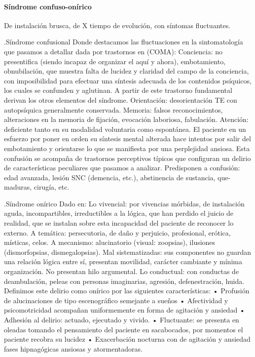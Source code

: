 \documentclass[encares.tex]{subfiles}
\begin{document}
\paragraph{Síndrome confuso-onírico}

De instalación brusca, de X tiempo de evolución, con síntomas fluctuantes.

.Síndrome confusional
Donde destacamos las fluctuaciones en la sintomatología que pasamos a detallar dada por trastornos en (COMA): Conciencia: no presentifica (siendo incapaz de organizar el aquí y ahora), embotamiento, obnubilación, que muestra falta de lucidez y claridad del campo de la conciencia, con imposibilidad para efectuar una síntesis adecuada de los contenidos psíquicos, los cuales se confunden y aglutinan. A partir de este trastorno fundamental derivan los otros elementos del síndrome. Orientación: desorientación TE con autopsíquica generalmente conservada. Memoria: falsos reconocimientos, alteraciones en la memoria de fijación, evocación laboriosa, fabulación. Atención: deficiente tanto en su modalidad voluntaria como espontánea. El paciente en un esfuerzo por poner en orden su síntesis mental alterada hace intentos por salir del embotamiento y orientarse lo que se manifiesta por una perplejidad ansiosa. Esta confusión se acompaña de trastornos perceptivos típicos que configuran un delirio de características peculiares que pasamos a analizar. Predisponen a confusión: edad avanzada, lesión SNC (demencia, etc.), abstinencia de sustancia, que-maduras, cirugía, etc.

.Síndrome onírico
Dado en: Lo vivencial: por vivencias mórbidas, de instalación aguda, incompartibles, irreductibles a la lógica, que han perdido el juicio de realidad, que se instalan sobre esta incapacidad del paciente de reconocer lo externo. A temática: persecutoria, de daño y perjuicio, profesional, erótica, místicas, celos. A mecanismo: alucinatorio (visual: zoopsias), ilusiones (dismorfopsias, dismegalopsias). Mal sistematizadas: sus componentes no guardan una relación lógica entre sí, presentan movilidad, carácter cambiante y mínima organización. No presentan hilo argumental. Lo conductual: con conductas de deambulación, peleas con personas imaginarias, agresión, defenestración, huida. Definimos este delirio como onírico por las siguientes características: • Profusión de alucinaciones de tipo escenográfico semejante a sueños • Afectividad y psicomotricidad acompañan uniformemente en forma de agitación y ansiedad • Adhesión al delirio: actuado, ejecutado y vivido. • Fluctuante: se presenta en oleadas tomando el pensamiento del paciente en sacabocados, por momentos el paciente recobra su lucidez • Exacerbación nocturna con de agitación y ansiedad fases hipnagógicas ansiosas y atormentadoras.
\end{document}

